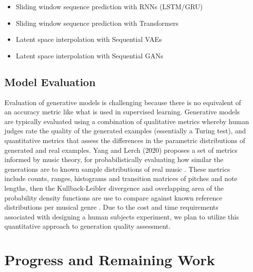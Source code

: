 \documentclass[sigconf,authorversion]{acmart}
\begin{document}
\begin{itemize}
  \item{Sliding window sequence prediction with RNNs (LSTM/GRU)}
  \item{Sliding window sequence prediction with Transformers}
  \item{Latent space interpolation with Sequential VAEs}
  \item{Latent space interpolation with Sequential GANs}
\end{itemize}

\subsection{Model Evaluation}

Evaluation of generative models is challenging because there is no equivalent of
an accuracy metric like what is used in supervised learning. Generative models
are typically evaluated using a combination of qualitative metrics whereby human
judges rate the quality of the generated examples (essentially a Turing test),
and quantitative metrics that assess the differences in the parametric
distributions of generated and real examples. Yang and Lerch (2020) proposes a
set of metrics informed by music theory, for probabilistically evaluating how
similar the generations are to known sample distributions of real music
\cite{yang_evaluation_2020}. These metrics include counts, ranges, histograms
and transition matrices of pitches and note lengths, then the Kullback-Leibler
divergence and overlapping area of the probability density functions are use to
compare against known reference distributions per musical genre
\cite{yang_evaluation_2020}. Due to the cost and time requirements associated
with designing a human subjects experiment, we plan to utilize this quantitative
approach to generation quality assessment.

\section{Progress and Remaining Work}



\end{document}
